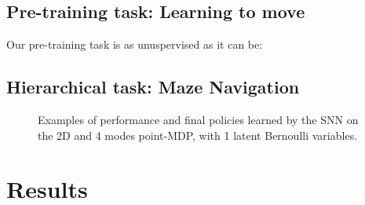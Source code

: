 \documentclass{article} %
\begin{document}
\subsection{Pre-training task: Learning to move}
Our pre-training task is as unuspervised as it can be: 

\subsection{Hierarchical task: Maze Navigation}

\begin{figure}[h!]
	\centering
	\caption{Examples of performance and final policies learned by the SNN on the 2D and 4 modes point-MDP, with 1 latent Bernoulli variables.}
	\label{fig:snn_multimodal_MI}
\end{figure}


\section{Results}
\end{document}

